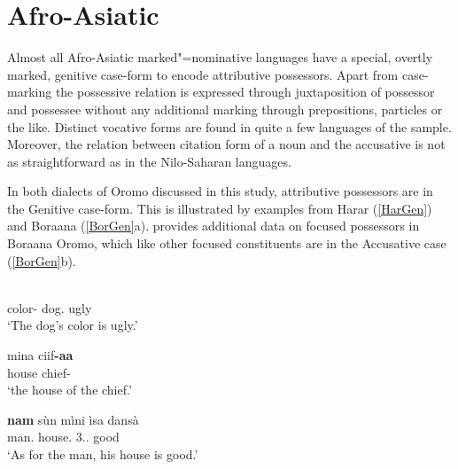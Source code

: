 \section{Afro-Asiatic}\label{ExtraAfro}

Almost all Afro-Asiatic marked"=nominative languages have a special, overtly marked, genitive case-form to encode attributive possessors.
Apart from case-marking the possessive relation is expressed through juxtaposition of possessor and possessee without any additional marking through prepositions, particles or the like. 
Distinct vocative forms are found in quite a few languages of the sample. 
Moreover, the relation between citation form of a noun and the accusative is not as straightforward as in the Nilo-Saharan languages.


In both dialects of Oromo discussed in this study, attributive possessors are in the Genitive case-form. 
This is illustrated by examples from Harar (\ref{HarGen}) and Boraana (\ref{BorGen}a). 
\citet[50]{Owens:1982} provides additional data on focused possessors in Boraana Oromo, which like other focused constituents are in the Accusative case (\ref{BorGen}b). 


\begin{exe}\ex\label{HarGen}
\gll{} \textbf{} \\
color-\nom{} dog.\gen{} ugly\\
\glt `The dog's color is ugly.'
\end{exe}

\begin{exe}\ex\label{BorGen}
\begin{xlist}
\ex\gll mina ciif\textbf{-aa}\\
house chief-\gen{}\\
\glt `the house of the chief.'

\ex\gll \textbf{nam} s\`un m\`ini \`isa dans\`a\\
man.\acc{} \dem{} house.\acc{} 3\sg{}.\mas{}.\poss{} good\\
\glt `As for the man, his house is good.' %
\end{xlist}
\end{exe} 

